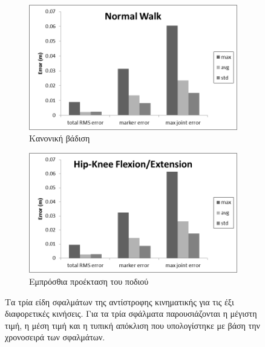 \begin{figure}[H]
    \begin{subfigure}[t]{.48\textwidth}
        \includegraphics[width=\textwidth, keepaspectratio]{fig/ik-reg2.png}
        \caption{Κανονική βάδιση}
        \label{fig:noraml-walk}
    \end{subfigure}
    \begin{subfigure}[t]{.48\textwidth}
        \includegraphics[width=\textwidth, keepaspectratio]{fig/ik-reg3.png}
        \caption{Εμπρόσθια προέκταση του ποδιού}
        \label{fig:knee-hip-extension}
    \end{subfigure}
    \caption{Τα τρία είδη σφαλμάτων της αντίστροφης κινηματικής για τις έξι διαφορετικές κινήσεις. Για τα τρία σφάλματα παρουσιάζονται η μέγιστη τιμή, η μέση τιμή και η τυπική απόκλιση που υπολογίστηκε με βάση την χρονοσειρά των σφαλμάτων.}
    \label{fig:ik-error-regions}
\end{figure}

